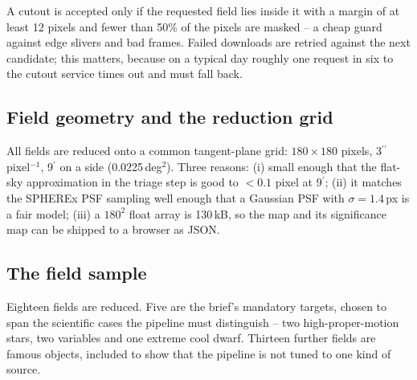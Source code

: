 \documentclass[11pt,a4paper]{article}
\newcommand{\arcmin}{\ensuremath{{}^{\prime}}}
\newcommand{\arcsec}{\ensuremath{{}^{\prime\prime}}}
\begin{document}
A cutout is accepted only if the requested field lies inside it with a margin of at least 12 pixels
and fewer than 50\% of the pixels are masked -- a cheap guard against edge slivers and bad frames.
Failed downloads are retried against the next candidate; this matters, because on a typical day
roughly one request in six to the cutout service times out and must fall back.

\subsection{Field geometry and the reduction grid}

All fields are reduced onto a common tangent-plane grid: $180\times180$ pixels, $3\arcsec$\,pixel$^{-1}$,
9\arcmin{} on a side (0.0225\,deg$^2$). Three reasons: (i) small enough that the flat-sky
approximation in the triage step is good to $<0.1$ pixel at 9\arcmin; (ii) it matches the SPHEREx PSF
sampling well enough that a Gaussian PSF with $\sigma = 1.4$\,px is a fair model; (iii) a $180^2$ float
array is 130\,kB, so the map and its significance map can be shipped to a browser as JSON.

\subsection{The field sample}

Eighteen fields are reduced. Five are the brief's mandatory targets, chosen to span the scientific
cases the pipeline must distinguish -- two high-proper-motion stars, two variables and one extreme cool
dwarf. Thirteen further fields are famous objects, included to show that the pipeline is not tuned to
one kind of source.
\end{document}

